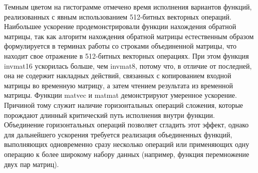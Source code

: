 Темным цветом на гистограмме отмечено время исполнения вариантов функций, реализованных с явным использованием 512-битных векторных операций.
Наибольшее ускорение продемонстрировали функции нахождения обратной матрицы, так как алгоритм нахождения обратной матрицы естественным образом формулируется в терминах работы со строками объединенной матрицы, что находит свое отражение в 512-битных векторных операциях.
При этом функция invmat16 ускорилась больше, чем invmat8, потому что, в отличие от последней, она не содержит накладных действий, связанных с копированием входной матрицы во временную матрицу, а затем чтением результата из временной матрицы. Функции matvec и matmat демонстрируют умеренное ускорение.
Причиной тому служит наличие горизонтальных операций сложения, которые порождают длинный критический путь исполнения внутри функции.
Объединение горизонтальных операций позволяет сгладить этот эффект, однако для дальнейшего ускорения требуется реализация объединенных функций, выполняющих одновременно сразу несколько операций или применяющих одну операцию к более широкому набору данных (например, функция перемножение двух пар матриц).
